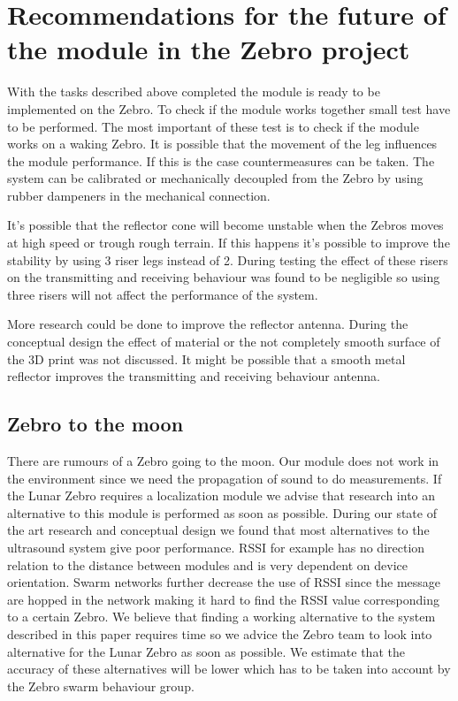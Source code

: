 \section{Recommendations for the future of the module in the Zebro project}

With the tasks described above completed the module is ready to be implemented on the Zebro.
To check if the module works together small test have to be performed.
The most important of these test is to check if the module works on a waking Zebro.
It is possible that the movement of the leg influences the module performance.
If this is the case countermeasures can be taken.
The system can be calibrated or mechanically decoupled from the Zebro by using rubber dampeners in the mechanical connection.

It's possible that the reflector cone will become unstable when the Zebros moves at high speed or trough rough terrain.
If this happens it's possible to improve the stability by using 3 riser legs instead of 2.
During testing the effect of these risers on the transmitting and receiving behaviour was found to be negligible so using three risers will not affect the performance of the system.

More research could be done to improve the reflector antenna.
During the conceptual design the effect of material or the not completely smooth surface of the 3D print was not discussed.
It might be possible that a smooth metal reflector improves the transmitting and receiving behaviour antenna.

\subsection*{Zebro to the moon}

There are rumours of a Zebro going to the moon.
Our module does not work in the environment since we need the propagation of sound to do measurements.
If the Lunar Zebro requires a localization module we advise that research into an alternative to this module is performed as soon as possible.
During our state of the art research and conceptual design we found that most alternatives to the ultrasound system give poor performance.
RSSI for example has no direction relation to the distance between modules and is very dependent on device orientation.
Swarm networks further decrease the use of RSSI since the message are hopped in the network making it hard to find the RSSI value corresponding to a certain Zebro.
We believe that finding a working alternative to the system described in this paper requires time so we advice the Zebro team to look into alternative for the Lunar Zebro as soon as possible.
We estimate that the accuracy of these alternatives will be lower which has to be taken into account by the Zebro swarm behaviour group.
